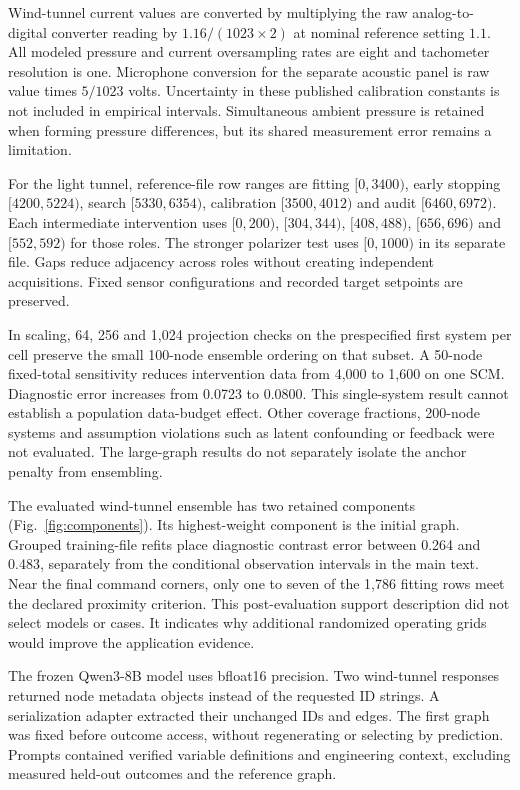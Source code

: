 \documentclass{svproc}
\begin{document}
Wind-tunnel current values are converted by multiplying the raw analog-to-digital converter reading by
$1.16/(1023\times2)$ at nominal reference setting $1.1$. All modeled pressure and
current oversampling rates are eight and tachometer resolution is one. Microphone
conversion for the separate acoustic panel is raw value times $5/1023$ volts.
Uncertainty in these published calibration constants is not included in empirical
intervals. Simultaneous ambient pressure is retained when forming pressure
differences, but its shared measurement error remains a limitation.

For the light tunnel, reference-file row ranges are fitting $[0,3400)$, early
stopping $[4200,5224)$, search $[5330,6354)$, calibration $[3500,4012)$ and audit
$[6460,6972)$. Each intermediate intervention uses $[0,200)$, $[304,344)$,
$[408,488)$, $[656,696)$ and $[552,592)$ for those roles. The stronger polarizer
test uses $[0,1000)$ in its separate file. Gaps reduce adjacency across roles
without creating independent acquisitions. Fixed sensor configurations and
recorded target setpoints are preserved.

In scaling, 64, 256 and 1,024 projection checks on the prespecified first system
per cell preserve the small 100-node ensemble ordering on that subset. A
50-node fixed-total sensitivity reduces intervention data from 4,000 to 1,600
on one SCM. Diagnostic error increases from 0.0723 to 0.0800. This single-system
result cannot establish a population data-budget effect. Other coverage fractions,
200-node systems and assumption violations such as latent confounding or feedback
were not evaluated. The large-graph results do not separately isolate the
anchor penalty from ensembling.

The evaluated wind-tunnel ensemble has two retained components
(Fig.~\ref{fig:components}). Its highest-weight component is the initial graph.
Grouped training-file refits place diagnostic contrast error between 0.264 and
0.483, separately from the conditional observation intervals in the main text.
Near the final command corners, only one to seven of the 1,786 fitting rows meet
the declared proximity criterion. This post-evaluation support description did
not select models or cases. It indicates why additional randomized operating
grids would improve the application evidence.

The frozen Qwen3-8B model uses bfloat16 precision. Two wind-tunnel responses returned node metadata objects instead of the requested ID strings.
A serialization adapter extracted their unchanged IDs and edges. The first
graph was fixed before outcome access, without regenerating or selecting by
prediction. Prompts contained verified variable definitions and engineering
context, excluding measured held-out outcomes and the reference graph.
\end{document}
